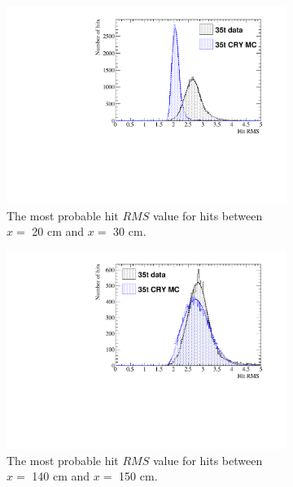 \begin{figure}[h!]
  \centering
  \begin{subfigure}{0.48\textwidth}
    \centering
    \includegraphics[width=\textwidth]{CombCan_0}
    \caption{The most probable hit $RMS$ value for hits between $x =$ 20 cm and $x =$ 30 cm.}
  \end{subfigure}%
  \hspace{0.03\textwidth}%
  \begin{subfigure}{0.48\textwidth}
    \centering
    \includegraphics[width=\textwidth]{CombCan_1}
    \caption{The most probable hit $RMS$ value for hits between $x =$ 140 cm and $x =$ 150 cm.}
  \end{subfigure}
  \begin{subfigure}{0.48\textwidth}
    \centering

\end{subfigure}
\end{figure}

